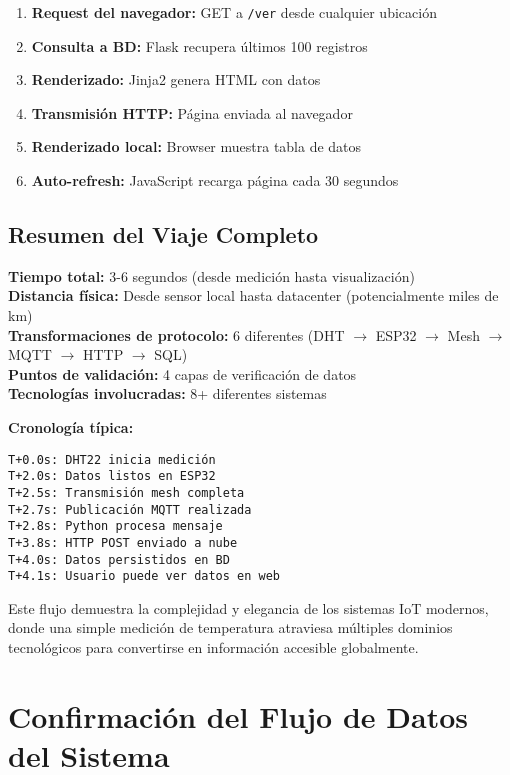\documentclass[12pt]{article}
\begin{document}
\begin{enumerate}
    \item \textbf{Request del navegador:} GET a \texttt{/ver} desde cualquier ubicación
    \item \textbf{Consulta a BD:} Flask recupera últimos 100 registros
    \item \textbf{Renderizado:} Jinja2 genera HTML con datos
    \item \textbf{Transmisión HTTP:} Página enviada al navegador
    \item \textbf{Renderizado local:} Browser muestra tabla de datos
    \item \textbf{Auto-refresh:} JavaScript recarga página cada 30 segundos
\end{enumerate}

\subsection{Resumen del Viaje Completo}

\textbf{Tiempo total:} 3-6 segundos (desde medición hasta visualización)\\
\textbf{Distancia física:} Desde sensor local hasta datacenter (potencialmente miles de km)\\
\textbf{Transformaciones de protocolo:} 6 diferentes (DHT $\rightarrow$ ESP32 $\rightarrow$ Mesh $\rightarrow$ MQTT $\rightarrow$ HTTP $\rightarrow$ SQL)\\
\textbf{Puntos de validación:} 4 capas de verificación de datos\\
\textbf{Tecnologías involucradas:} 8+ diferentes sistemas

\textbf{Cronología típica:}
\begin{verbatim}
T+0.0s: DHT22 inicia medición
T+2.0s: Datos listos en ESP32
T+2.5s: Transmisión mesh completa
T+2.7s: Publicación MQTT realizada
T+2.8s: Python procesa mensaje
T+3.8s: HTTP POST enviado a nube
T+4.0s: Datos persistidos en BD
T+4.1s: Usuario puede ver datos en web
\end{verbatim}

Este flujo demuestra la complejidad y elegancia de los sistemas IoT modernos, donde una simple medición de temperatura atraviesa múltiples dominios tecnológicos para convertirse en información accesible globalmente.

\section{Confirmación del Flujo de Datos del Sistema}
\end{document}
